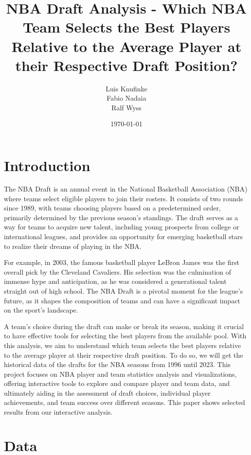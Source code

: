 \documentclass[12pt]{article}
\title{NBA Draft Analysis - Which NBA Team Selects the Best Players Relative to the Average Player at their Respective Draft Position?}
\author{Luis Knufinke \\ Fabio Nadaia \\ Ralf Wyss}
\date{\today}
\begin{document}
\maketitle
\thispagestyle{empty}


\newpage
\tableofcontents

\thispagestyle{empty}

\newpage
{} %
\setcounter{page}{1} %

\section{Introduction}
The NBA Draft is an annual event in the National Basketball Association (NBA) where teams select eligible players to join their rosters. It consists of two rounds since 1989, with teams choosing players based on a predetermined order, primarily determined by the previous season's standings. The draft serves as a way for teams to acquire new talent, including young prospects from college or international leagues, and provides an opportunity for emerging basketball stars to realize their dreams of playing in the NBA.

For example, in 2003, the famous basketball player LeBron James was the first overall pick by the Cleveland Cavaliers. His selection was the culmination of immense hype and anticipation, as he was considered a generational talent straight out of high school. The NBA Draft is a pivotal moment for the league's future, as it shapes the composition of teams and can have a significant impact on the sport's landscape.

A team’s choice during the draft can make or break its season, making it crucial to have effective tools for selecting the best players from the available pool. With this analysis, we aim to understand which team selects the best players relative to the average player at their respective draft position. To do so, we will get the historical data of the drafts for the NBA seasons from 1996 until 2023. This project focuses on NBA player and team statistics analysis and visualizations, offering interactive tools to explore and compare player and team data, and ultimately aiding in the assessment of draft choices, individual player achievements, and team success over different seasons. This paper shows selected results from our interactive analysis.


\section{Data}
\end{document}

